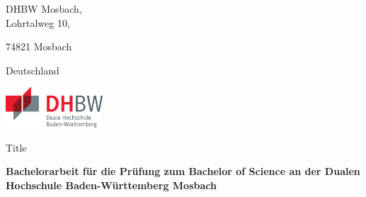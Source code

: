 \def\title{Title}
\def\author{Vorname Nachname}

\begin{titlepage}


\begin{minipage}[t]{0.25\textwidth}
DHBW Mosbach,\\

Lohrtalweg 10,

74821 Mosbach

Deutschland
\end{minipage}
\hfill
\begin{minipage}[t]{0.25\textwidth}
\includegraphics[height=1.5cm]{prefix/image/logo-dhbw.eps}
\end{minipage}




\begin{center}
	\vspace{5mm}
	
	\huge \title
	
	\vspace{50pt}
	
	\large \bfseries Bachelorarbeit für die Prüfung zum Bachelor of Science an der Dualen Hochschule Baden-Württemberg Mosbach

	
\end{center}

\vspace{15pt}


\end{titlepage}
